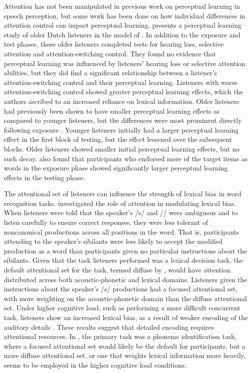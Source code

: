 Attention has not been manipulated in previous work on perceptual learning in speech perception, but some work has been done on how individual differences in attention control can impact perceptual learning.
\citet{Scharenborg2014} presents a perceptual learning study of older Dutch listeners in the model of \citet{Norris2003}.  
In addition to the exposure and test phases, these older listeners completed tests for hearing loss, selective attention and attention-switching control.  
They found no evidence that perceptual learning was influenced by listeners' hearing loss or selective attention abilities, but they did find a significant relationship between a listener's attention-switching control and their perceptual learning.  
Listeners with worse attention-switching control showed greater perceptual learning effects, which the authors ascribed to an increased reliance on lexical information.  
Older listeners had previously been shown to have smaller perceptual learning effects as compared to younger listeners, but the differences were most prominent directly following exposure \citep{Scharenborg2013}.  
Younger listeners initially had a larger perceptual learning effect in the first block of testing, but the effect lessened over the subsequent blocks.  
Older listeners showed smaller initial perceptual learning effects, but no such decay.  
\citet{Scharenborg2013} also found that participants who endorsed more of the target items as words in the exposure phase showed significantly larger perceptual learning effects in the testing phase.

The attentional set of listeners can influence the strength of lexical bias in word recognition tasks.
\citet{Pitt2012} investigated the role of attention in modulating lexical bias.  
When listeners were told that the speaker's /s/ and /\textesh/ were ambiguous and to listen carefully to ensure correct responses, they were less tolerant of noncanonical productions across all positions in the word.  
That is, participants attending to the speaker's sibilants were less likely to accept the modified production as a word than participants given no particular instructions about the sibilants.
Given that the task listeners performed was a lexical decision task, the default attentional set for the task, termed diffuse by \citet{Pitt2012}, would have attention distributed across both acoustic-phonetic and lexical domains.  Listeners given the instructions about the speaker's /s/ productions had a focused attentional set, with more weighting on the acoustic-phonetic domain than the diffuse attentional set.
Under higher cognitive load, such as performing a more difficult concurrent task, listeners show an increased lexical bias, as a result of weaker encoding of the auditory details \citep{Mattys2011}.  These results suggest that detailed encoding requires attentional resources.  In \citet{Mattys2011}, the primary task was a phoneme identification task, where a focused attentional set would likely be the default for participants, but a more diffuse attentional set, or one that weights lexical information more heavily, seems to be employed in the higher cognitive load conditions.

